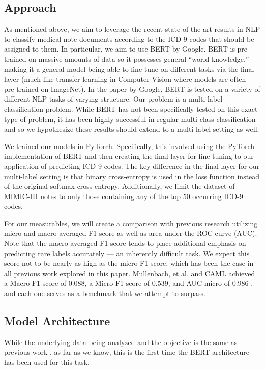 \documentclass[fleqn,10pt]{olplainarticle}
\begin{document}
\subsection{Approach}
As mentioned above, we aim to leverage the recent state-of-the-art results in NLP to classify medical note documents according to the ICD-9 codes that should be assigned to them. In particular, we aim to use BERT by Google. BERT is pre-trained on massive amounts of data so it possesses general “world knowledge,” making it a general model being able to fine tune on different tasks via the final layer \cite{bertPaper} (much like transfer learning in Computer Vision where models are often pre-trained on ImageNet). In the paper by Google, BERT is tested on a variety of different NLP tasks of varying structure. Our problem is a multi-label classification problem. While BERT has not been specifically tested on this exact type of problem, it has been highly successful in regular multi-class classification and so we hypothesize these results should extend to a multi-label setting as well.

We trained our models in PyTorch. Specifically, this involved using the PyTorch implementation of BERT and then creating the final layer for fine-tuning to our application of predicting ICD-9 codes. The key difference in the final layer for our multi-label setting is that binary cross-entropy is used in the loss function instead of the original softmax cross-entropy. Additionally, we limit the dataset of MIMIC-III notes to only those containing any of the top 50 occurring ICD-9 codes.

For our measurables, we will create a comparison with previous research utilizing micro and macro-averaged F1-score as well as area under the ROC curve (AUC).  Note that the macro-averaged F1 score tends to place additional emphasis on predicting rare labels accurately --- an inherently difficult task. We expect this score not to be nearly as high as the micro-F1 score, which has been the case in all previous work explored in this paper. Mullenbach, et al. and CAML achieved a Macro-F1 score of 0.088, a Micro-F1 score of 0.539, and AUC-micro of 0.986 \cite{explainablePredictionMedicalCodes}, and each one serves as a benchmark that we attempt to surpass.


\subsection{Model Architecture}
While the underlying data being analyzed and the objective is the same as previous work \cite{explainablePredictionMedicalCodes,scheurwegsSelectingRelevantFeaturesFromEHR}, as far as we know, this is the first time the BERT architecture has been used for this task.
\end{document}
